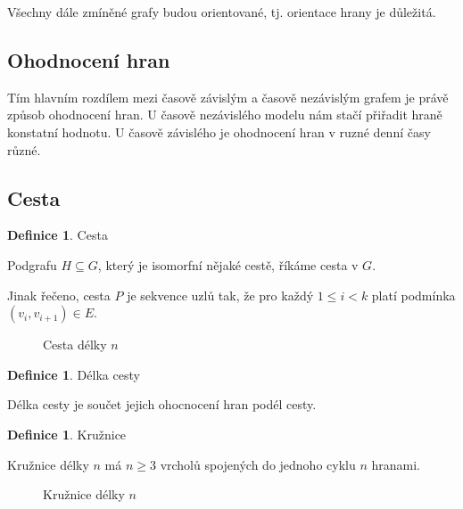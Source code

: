 \documentclass[thesis=M,czech]{FITthesis}[2019/12/23]
\theoremstyle{plain}
\theoremstyle{definition}
\newtheorem{defn}[thm]{Definice} %
\begin{document}
Všechny dále zmíněné grafy budou orientované, tj. orientace hrany je důležitá.


\subsection{Ohodnocení hran}

Tím hlavním rozdílem mezi časově závislým a časově nezávislým grafem je právě způsob ohodnocení hran. U časově nezávislého modelu nám stačí přiřadit hraně konstatní hodnotu. U časově závislého je ohodnocení hran v ruzné denní časy různé.

\subsection{Cesta}

\begin{defn}{Cesta}\label{thm:graf}

Podgrafu $H \subseteq	 G$, který je isomorfní nějaké cestě, říkáme cesta v $G$. 
\end{defn}

Jinak řečeno, cesta $P$ je sekvence uzlů tak, že pro každý $1 \leq	i < k$ platí podmínka $(v_i, v_{i+1}) \in	 E$. 

\begin{figure}[H]\centering
	

	\caption[Cesta délky $n$]{Cesta délky $n$}\label{fig:float}
\end{figure}


\begin{defn}{Délka cesty}\label{thm:graf}

	Délka cesty je součet jejich ohocnocení hran podél cesty.
	\end{defn}

	
\begin{defn}{Kružnice}\label{thm:graf}

Kružnice délky $n$ má $n \geq 3$ vrcholů spojených do jednoho cyklu $n$ hranami.
\end{defn}

\begin{figure}[H]\centering
	

	\caption[Kružnice délky $n$]{Kružnice délky $n$}\label{fig:float}
\end{figure}
\end{document}
